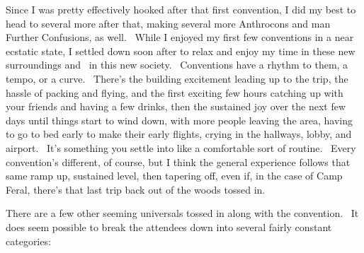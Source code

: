 Since I was pretty effectively hooked after that first convention, I did
my best to head to several more after that, making several more
Anthrocons and man Further Confusions, as well. ~While I enjoyed my
first few conventions in a near ecstatic state, I settled down soon
after to relax and enjoy my time in these new surroundings and ~in this
new society. ~Conventions have a rhythm to them, a tempo, or a curve.
~There's the building excitement leading up to the trip, the hassle of
packing and flying, and the first exciting few hours catching up with
your friends and having a few drinks, then the sustained joy over the
next few days until things start to wind down, with more people leaving
the area, having to go to bed early to make their early flights, crying
in the hallways, lobby, and airport. ~It's something you settle into
like a comfortable sort of routine. ~Every convention's different, of
course, but I think the general experience follows that same ramp up,
sustained level, then tapering off, even if, in the case of Camp Feral,
there's that last trip back out of the woods tossed in.

There are a few other seeming universals tossed in along with the
convention. ~It does seem possible to break the attendees down into
several fairly constant categories:

